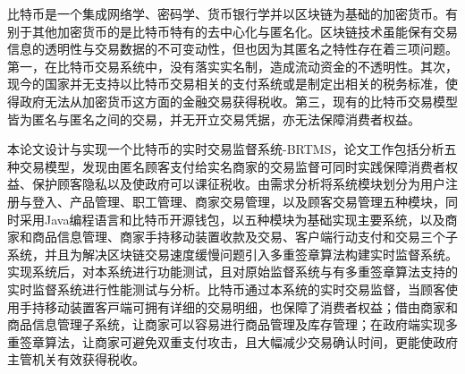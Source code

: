  
\begin{cabstract}

	⽐特币是⼀个集成网络学、密码学、货币银⾏学并以区块链为基础的加密货币。有别于其他加密货币的是⽐特币特有的去中⼼化与匿名化。区块链技术虽能保有交易信息的透明性与交易数据的不可变动性，但也因为其匿名之特性存在着三项问题。第一，在⽐特币交易系统中，没有落实实名制，造成流动资金的不透明性。其次，现今的国家并无⽀持以⽐特币交易相关的⽀付系统或是制定出相关的税务标准，使得政府无法从加密货币这⽅⾯的⾦融交易获得税收。第三，现有的⽐特币交易模型皆为匿名与匿名之间的交易，并无开⽴交易凭据，亦无法保障消费者权益。

	本论⽂设计与实现⼀个比特币的实时交易监督系统-BRTMS，论文工作包括分析五种交易模型，发现由匿名顾客支付给实名商家的交易监督可同时实践保障消费者权益、保护顾客隐私以及使政府可以课征税收。由需求分析将系统模块划分为用户注册与登入、产品管理、职工管理、商家交易管理，以及顾客交易管理五种模块，同时采用Java编程语言和比特币开源钱包，以五种模块为基础实现主要系统，以及商家和商品信息管理、商家手持移动装置收款及交易、客户端行动支付和交易三个子系统，并且为解决区块链交易速度缓慢问题引入多重签章算法构建实时监督系统。实现系统后，对本系统进行功能测试，且对原始监督系统与有多重签章算法支持的实时监督系统进行性能测试与分析。比特币通过本系统的实时交易监督，当顾客使用手持移动装置客⼾端可拥有详细的交易明细，也保障了消费者权益；借由商家和商品信息管理子系统，让商家可以容易进⾏商品管理及库存管理；在政府端实现多重签章算法，让商家可避免双重⽀付攻击，且大幅减少交易确认时间，更能使政府主管机关有效获得税收。

\end{cabstract}

